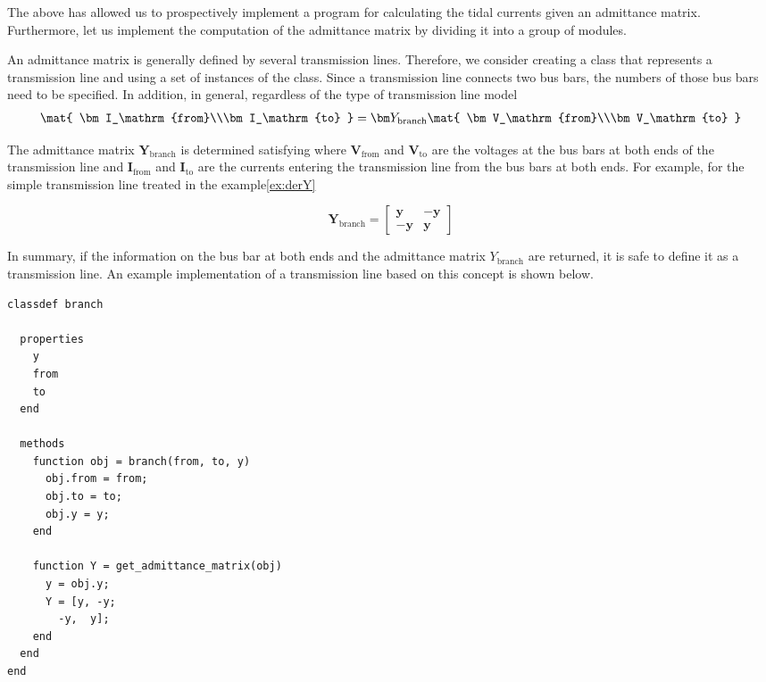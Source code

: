 \documentclass[tombow,dvipdfmx]{corona-a5-1.1}
\begin{document}
The above has allowed us to prospectively implement a program for calculating the tidal currents given an admittance matrix.
Furthermore, let us implement the computation of the admittance matrix by dividing it into a group of modules.

\begin{例}
An admittance matrix is generally defined by several transmission lines.
Therefore, we consider creating a class that represents a transmission line and using a set of instances of the class.
Since a transmission line connects two bus bars, the numbers of those bus bars need to be specified.
In addition, in general, regardless of the type of transmission line model
\begin{align}
\mat{
\bm I_\mathrm{from}\\\bm I_\mathrm{to}
} =
\bm Y_\mathrm{branch}
\mat{
\bm V_\mathrm{from}\\\bm V_\mathrm{to}
}
\end{align}

The admittance matrix $\bm Y_\mathrm{branch}$ is determined satisfying where $\bm V_\mathrm{from}$ and $\bm V_\mathrm{to}$ are the voltages at the bus bars at both ends of the transmission line and $\bm I_\mathrm{from}$ and $\bm I_\mathrm{to}$ are the currents entering the transmission line from the bus bars at both ends.
For example, for the simple transmission line treated in the example\ref{ex:derY}

\[
\bm Y_\mathrm{branch} = \begin{bmatrix}
\bm y & -\bm y\\
-\bm y & \bm y
\end{bmatrix}
\]

In summary, if the information on the bus bar at both ends and the admittance matrix $Y_\mathrm{branch}$ are returned, it is safe to define it as a transmission line.
An example implementation of a transmission line based on this concept is shown below.

\smallskip
\begin{PROGRAMA}[count,title={branch.m}]\label{program:branch}
\begin{verbatim}
classdef branch
  
  properties
    y
    from
    to
  end
  
  methods
    function obj = branch(from, to, y)
      obj.from = from;
      obj.to = to;
      obj.y = y;
    end
    
    function Y = get_admittance_matrix(obj)
      y = obj.y;
      Y = [y, -y;
        -y,  y];
    end
  end
end
\end{verbatim}\end{PROGRAMA}


\end{例}
\end{document}
